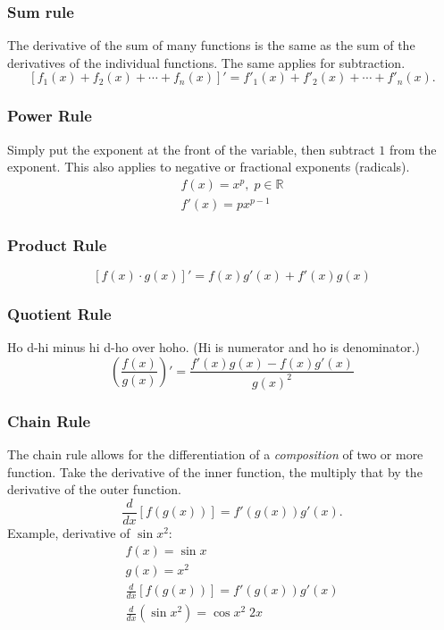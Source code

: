 \documentclass[12pt]{article}
\begin{document}
            \subsubsection{Sum rule}
                The derivative of the sum of many functions is the same as the sum of the derivatives of the individual functions. The same applies for subtraction.
                \[ \left[ f_1(x) + f_2(x) + \cdots + f_n(x) \right]' = f'_1(x) + f'_2(x) + \cdots + f'_n(x). \]

            \subsubsection{Power Rule}
                Simply put the exponent at the front of the variable, then subtract $1$ from the exponent. This also applies to negative or fractional exponents (radicals).
                \begin{gather*}
                    f(x) = x^p, \; p \in \mathbb{R} \\
                    f'(x) = px^{p-1}
                \end{gather*}

            \subsubsection{Product Rule}
                \[ \left[ f(x) \cdot g(x) \right]' = f(x)g'(x) + f'(x)g(x) \]

            \subsubsection{Quotient Rule}
                Ho d-hi minus hi d-ho over hoho. (Hi is numerator and ho is denominator.)
                \[ \left( \frac{f(x)}{g(x)} \right)' = \frac{f'(x)g(x) - f(x)g'(x)}{g(x)^2} \]

            \subsubsection{Chain Rule}
                The chain rule allows for the differentiation of a \textit{composition} of two or more function. Take the derivative of the inner function, the multiply that by the derivative of the outer function.
                \[ \frac{d}{dx} \left[ f \left( g(x) \right) \right] = f' \left( g(x) \right) g'(x). \]
                \newline
                Example, derivative of $\sin{x^2}$:
                \begin{gather*}
                    f(x) = \sin{x} \\
                    g(x) = x^2 \\
                    \frac{d}{dx} \left[ f \left( g(x) \right) \right] = f' \left( g(x) \right) g'(x) \\
                    \frac{d}{dx} \left( \sin{x^2} \right) = \cos{x^2} \; 2x
                \end{gather*}
\end{document}
